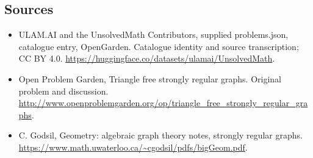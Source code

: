\documentclass[11pt,a4paper]{article}
\begin{document}
\subsection{Sources}
\begin{itemize}
\item[S1] ULAM.AI and the UnsolvedMath Contributors, supplied problems.json, catalogue entry, OpenGarden. Catalogue identity and source transcription; CC BY 4.0.
\url{https://huggingface.co/datasets/ulamai/UnsolvedMath}.
\item[S2] Open Problem Garden, Triangle free strongly regular graphs. Original problem and discussion.
\url{http://www.openproblemgarden.org/op/triangle_free_strongly_regular_graphs}.
\item[S3] C. Godsil, Geometry: algebraic graph theory notes, strongly regular graphs.
\url{https://www.math.uwaterloo.ca/~cgodsil/pdfs/bigGeom.pdf}.
\end{itemize}
\end{document}
